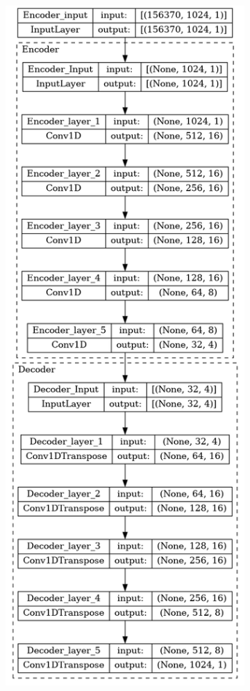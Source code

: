 \begin{appendices}
	\begin{figure}
		\ContinuedFloat 
		\begin{subfigure}{.5\textwidth}
			\includegraphics[width=\linewidth,height=\textheight]{../../Images/CR_8.png}

\end{subfigure}
\end{figure}
\end{appendices}
